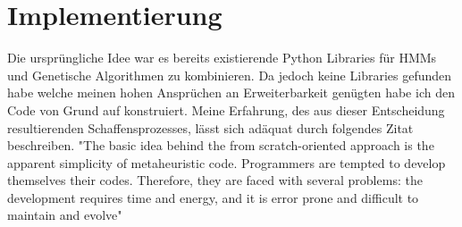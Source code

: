 \section{Implementierung}
Die ursprüngliche Idee war es bereits existierende Python Libraries für HMMs und Genetische Algorithmen zu kombinieren. Da jedoch keine Libraries gefunden habe welche meinen hohen Ansprüchen an Erweiterbarkeit genügten habe ich den Code von Grund auf konstruiert. Meine Erfahrung, des aus dieser Entscheidung resultierenden Schaffensprozesses, lässt sich adäquat durch folgendes Zitat beschreiben.
"The basic idea behind the from scratch-oriented approach is the apparent simplicity of metaheuristic code. Programmers are tempted to develop themselves their codes. Therefore, they are faced with several problems: the development requires time and energy, and it is error prone and difficult to maintain and evolve" \cite*{MetaheuristicsEGT}